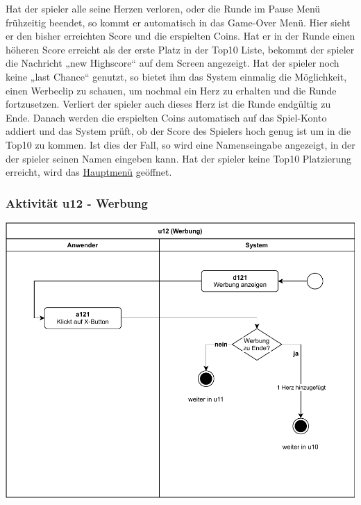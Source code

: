 Hat der \gls{spieler} alle seine Herzen verloren, oder die Runde im Pause Menü frühzeitig beendet, so kommt er automatisch in das Game-Over Menü. Hier sieht er den bisher erreichten Score und die erspielten Coins. Hat er in der Runde einen höheren Score erreicht als der erste Platz in der \gls{Top10} Liste, bekommt der \gls{spieler} die Nachricht „new Highscore“ auf dem Screen angezeigt. Hat der \gls{spieler} noch keine „last Chance“ genutzt, so bietet ihm das System einmalig die Möglichkeit, einen Werbeclip zu schauen, um nochmal ein Herz zu erhalten und die Runde fortzusetzen. Verliert der \gls{spieler} auch dieses Herz ist die Runde endgültig zu Ende. Danach werden die erspielten Coins automatisch auf das Spiel-Konto addiert und das System prüft, ob der Score des Spielers hoch genug ist um in die \gls{Top10} zu kommen. Ist dies der Fall, so wird eine Namenseingabe angezeigt, in der der \gls{spieler} seinen Namen eingeben kann. Hat der \gls{spieler} keine \gls{Top10} Platzierung erreicht, wird das \hyperref[fig:dia:mainMenu]{Hauptmenü} geöffnet.
\clearpage

\subsubsection{Aktivität u12 - Werbung}

\vspace*{1cm}

\includegraphics[width=\linewidth]{diagramme/pdf/UML-Activity-u12.pdf}
\label{fig:dia:ads}
\vspace*{0.5cm}

